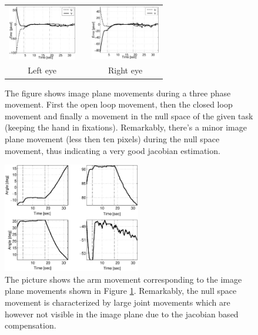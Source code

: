   \begin{figure}
  \begin{center}
	\begin{tabular}{ccc}
	  \parbox{30mm}{\includegraphics[width=30mm]{Figure/RedundancyLeft.eps}}  & \hspace{.1cm} &
	  \parbox{30mm}{\includegraphics[width=30mm]{Figure/RedundancyRight.eps}}
	  \\
	  \parbox{30mm}{\centering Left eye } & \hspace{.1cm} & \parbox{30mm}{\centering Right eye }
  \end{tabular}
\end{center}
\caption{The figure shows image plane movements during a three phase movement. First the open loop movement, then the closed loop movement and finally a movement in the null space of the given task (keeping the hand in fixations). Remarkably, there's a minor image plane movement (less then ten pixels) during the null space movement, thus indicating a very good jacobian estimation.}\label{Fig:RedundancyImagePlane}
  \end{figure}
  
  \begin{figure}
  \begin{center}
	\includegraphics[width=60mm]{Figure/RedundancyArm.eps}
	\end{center}
\caption{The picture shows the arm movement corresponding to the image plane movements shown in Figure \ref{Fig:RedundancyImagePlane}. Remarkably, the null space movement is characterized by large joint movements which are however not visible in the image plane due to the jacobian based compensation.} \label{Fig:RedundancyArm}
  \end{figure}